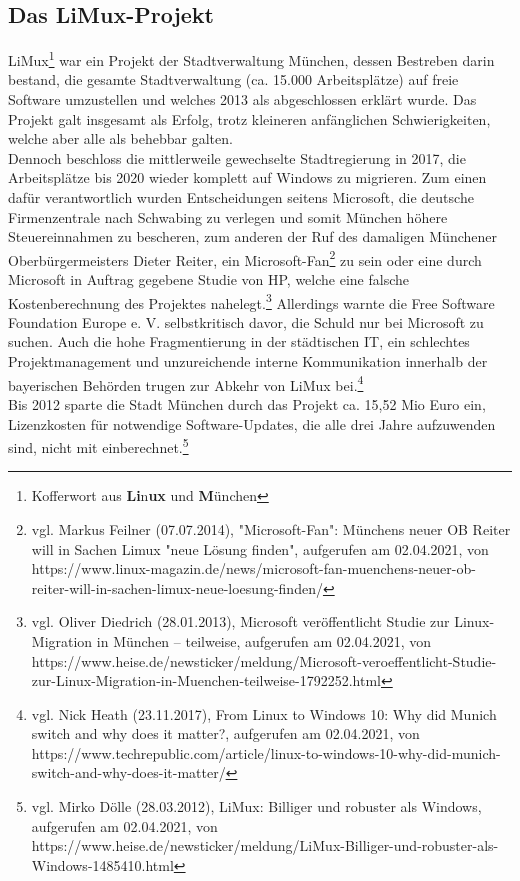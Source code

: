 \subsection{Das LiMux-Projekt}
\glqq LiMux\grqq\footnote{Kofferwort aus \textbf{Li}n\textbf{ux} und \textbf{M}ünchen} war ein Projekt der Stadtverwaltung München, dessen Bestreben darin bestand, die gesamte Stadtverwaltung (ca. 15.000 Arbeitsplätze) auf freie Software umzustellen und welches 2013 als abgeschlossen erklärt wurde. Das Projekt galt insgesamt als Erfolg, trotz kleineren anfänglichen Schwierigkeiten, welche aber alle als behebbar galten.\\
Dennoch beschloss die mittlerweile gewechselte Stadtregierung in 2017, die Arbeitsplätze bis 2020 wieder komplett auf Windows zu migrieren. Zum einen dafür verantwortlich wurden Entscheidungen seitens Microsoft, die deutsche Firmenzentrale nach Schwabing zu verlegen und somit München höhere Steuereinnahmen zu bescheren, zum anderen der Ruf des damaligen Münchener Oberbürgermeisters Dieter Reiter, ein \glqq Microsoft-Fan\grqq{}\footnote{vgl. Markus Feilner (07.07.2014), "Microsoft-Fan": Münchens neuer OB Reiter will in Sachen Limux "neue Lösung finden", aufgerufen am 02.04.2021, von https://www.linux-magazin.de/news/microsoft-fan-muenchens-neuer-ob-reiter-will-in-sachen-limux-neue-loesung-finden/} zu sein oder eine durch Microsoft in Auftrag gegebene Studie von HP, welche eine falsche Kostenberechnung des Projektes nahelegt.\footnote{vgl. Oliver Diedrich (28.01.2013), Microsoft veröffentlicht Studie zur Linux-Migration in München – teilweise, aufgerufen am 02.04.2021, von https://www.heise.de/newsticker/meldung/Microsoft-veroeffentlicht-Studie-zur-Linux-Migration-in-Muenchen-teilweise-1792252.html} Allerdings warnte die \glqq Free Software Foundation Europe e. V.\grqq{} selbstkritisch davor, die Schuld nur bei Microsoft zu suchen. Auch die hohe Fragmentierung in der städtischen IT, ein schlechtes Projektmanagement und unzureichende interne Kommunikation innerhalb der bayerischen Behörden trugen zur Abkehr von LiMux bei.\footnote{vgl. Nick Heath (23.11.2017), From Linux to Windows 10: Why did Munich switch and why does it matter?, aufgerufen am 02.04.2021, von https://www.techrepublic.com/article/linux-to-windows-10-why-did-munich-switch-and-why-does-it-matter/}\\
Bis 2012 sparte die Stadt München durch das Projekt ca. 15,52 Mio Euro ein, Lizenzkosten für notwendige Software-Updates, die alle drei Jahre aufzuwenden sind, nicht mit einberechnet.\footnote{vgl. Mirko Dölle (28.03.2012), LiMux: Billiger und robuster als Windows, aufgerufen am 02.04.2021, von https://www.heise.de/newsticker/meldung/LiMux-Billiger-und-robuster-als-Windows-1485410.html}
\vfill